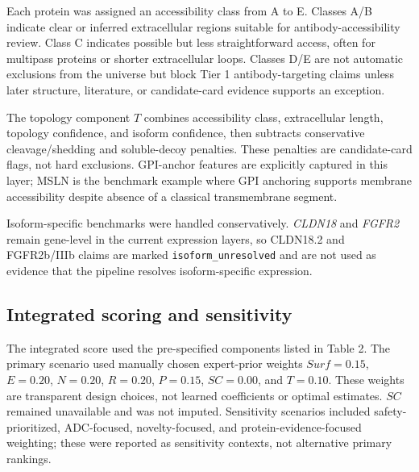 \documentclass[preprint,12pt,authoryear]{elsarticle}
\begin{document}
Each protein was assigned an accessibility class from A to E. Classes A/\allowbreak{}B indicate clear or inferred extracellular regions suitable for antibody-accessibility review. Class C indicates possible but less straightforward access, often for multipass proteins or shorter extracellular loops. Classes D/\allowbreak{}E are not automatic exclusions from the universe but block Tier 1 antibody-targeting claims unless later structure, literature, or candidate-card evidence supports an exception.

The topology component $T$ combines accessibility class, extracellular length, topology confidence, and isoform confidence, then subtracts conservative cleavage/\allowbreak{}shedding and soluble-decoy penalties. These penalties are candidate-card flags, not hard exclusions. GPI-anchor features are explicitly captured in this layer;\allowbreak{} MSLN is the benchmark example where GPI anchoring supports membrane accessibility despite absence of a classical transmembrane segment.

Isoform-specific benchmarks were handled conservatively. \textit{CLDN18} and \textit{FGFR2} remain gene-level in the current expression layers, so CLDN18.2 and FGFR2b/\allowbreak{}IIIb claims are marked \texttt{isoform\_\allowbreak{}unresolved} and are not used as evidence that the pipeline resolves isoform-specific expression.

\subsection{Integrated scoring and sensitivity}

The integrated score used the pre-specified components listed in Table 2. The primary scenario used manually chosen expert-prior weights $Surf=0.15$, $E=0.20$, $N=0.20$, $R=0.20$, $P=0.15$, $SC=0.00$, and $T=0.10$. These weights are transparent design choices, not learned coefficients or optimal estimates. $SC$ remained unavailable and was not imputed. Sensitivity scenarios included safety-prioritized, ADC-focused, novelty-focused, and protein-evidence-focused weighting;\allowbreak{} these were reported as sensitivity contexts, not alternative primary rankings.
\end{document}
